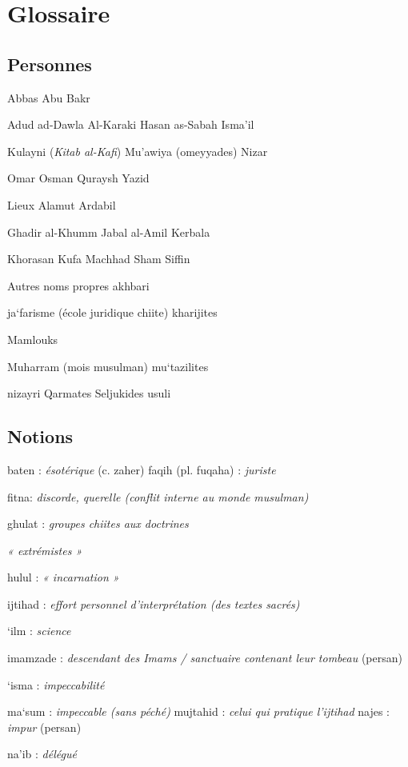  
\section{Glossaire}
 
\subsection{Personnes} Abbas Abu Bakr

Adud ad-Dawla Al-Karaki Hasan as-Sabah Isma'il

Kulayni (\emph{Kitab al-Kafi}) Mu'awiya (omeyyades) Nizar

Omar Osman Quraysh Yazid

{Lieux} Alamut Ardabil

Ghadir al-Khumm Jabal al-Amil Kerbala

Khorasan Kufa Machhad Sham Siffin

{Autres noms propres} akhbari

ja`farisme (école juridique chiite) kharijites

Mamlouks

Muharram (mois musulman) mu`tazilites

nizayri Qarmates Seljukides usuli

\subsection{Notions}



baten : \emph{ésotérique} (c. zaher) faqih (pl. fuqaha) : \emph{juriste}

fitna: \emph{discorde, querelle (conflit interne au monde musulman)}

ghulat : \emph{groupes chiites aux doctrines}

\emph{« extrémistes »}

hulul : \emph{« incarnation »}

ijtihad : \emph{effort personnel d'interprétation (des textes sacrés)}

`ilm : \emph{science}

imamzade : \emph{descendant des Imams / sanctuaire contenant leur
tombeau} (persan)

`isma : \emph{impeccabilité}



ma`sum : \emph{impeccable (sans péché)} mujtahid : \emph{celui qui
pratique l'ijtihad} najes : \emph{impur} (persan)

na'ib : \emph{délégué}

